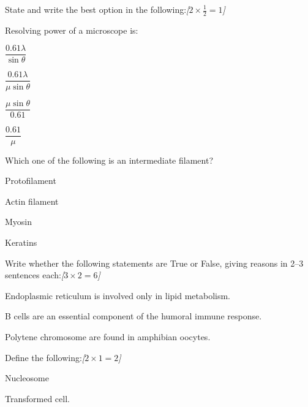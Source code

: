 \documentclass[11pt,a4paper]{article}
\newcommand{\pts}[1]{\hfill   \textit{[#1]}}
\begin{document}
\begin{parts}
  \item State and write the best option in the following:\pts{$2  \times \frac{1}{2} = 1$}
  
\begin{parts}
    \item Resolving power of a microscope is:
    
\begin{parts}
      \item $\dfrac{0.61 \lambda}{\sin  \theta}$
      \item $\dfrac{0.61 \lambda}{\mu \sin  \theta}$
      \item $\dfrac{\mu \sin  \theta}{0.61}$
      \item $\dfrac{0.61}{\mu}$
    \end{parts}

    \item Which one of the following is an intermediate filament?
    
\begin{parts}
      \item Protofilament
      \item Actin filament
      \item Myosin
      \item Keratins
    \end{parts}
  \end{parts}

  \item Write whether the following statements are True or False, giving reasons in 2--3 sentences each:\pts{$3  \times 2 = 6$}
  
\begin{parts}
    \item Endoplasmic reticulum is involved only in lipid metabolism.
    \item B cells are an essential component of the humoral immune response.
    \item Polytene chromosome are found in amphibian oocytes.
  \end{parts}

  \item Define the following:\pts{$2  \times 1 = 2$}
  
\begin{parts}
    \item Nucleosome
    \item Transformed cell.
  \end{parts}


\end{parts}
\end{document}
